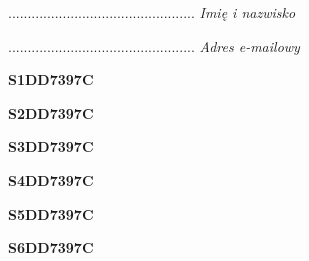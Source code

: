 \begin{turn}{90}\begin{minipage}{\linewidth} \vspace{20mm} ................................................  \textit{Imię i nazwisko}\end{minipage}\end{turn}

\begin{turn}{90}\begin{minipage}{\linewidth} \vspace{20mm} ................................................  \textit{Adres e-mailowy}\end{minipage}\end{turn}

\begin{turn}{90}\huge \begin{minipage}{\linewidth} \vspace{10mm}\textbf{S1DD7397C}\end{minipage}\end{turn}

\begin{turn}{90}\huge \begin{minipage}{\linewidth} \vspace{10mm}\textbf{S2DD7397C}\end{minipage}\end{turn}

\begin{turn}{90}\huge \begin{minipage}{\linewidth} \vspace{10mm}\textbf{S3DD7397C}\end{minipage}\end{turn}

\begin{turn}{90}\huge \begin{minipage}{\linewidth} \vspace{10mm}\textbf{S4DD7397C}\end{minipage}\end{turn}

\begin{turn}{90}\huge \begin{minipage}{\linewidth} \vspace{10mm}\textbf{S5DD7397C}\end{minipage}\end{turn}

\begin{turn}{90}\huge \begin{minipage}{\linewidth} \vspace{10mm}\textbf{S6DD7397C}\end{minipage}\end{turn}

